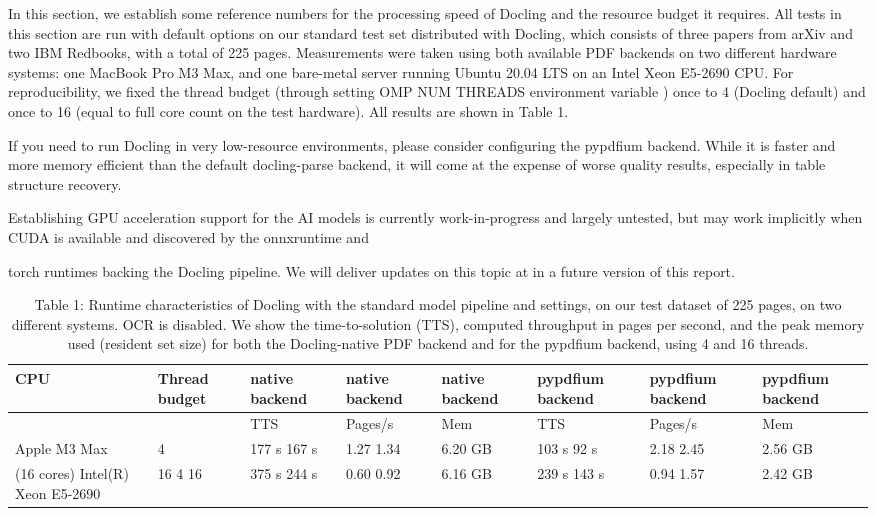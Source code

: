 \documentclass[11pt,a4paper]{article}
\begin{document}
In this section, we establish some reference numbers for the processing speed of Docling and the resource budget it requires. All tests in this section are run with default options on our standard test set distributed with Docling, which consists of three papers from arXiv and two IBM Redbooks, with a total of 225 pages. Measurements were taken using both available PDF backends on two different hardware systems: one MacBook Pro M3 Max, and one bare-metal server running Ubuntu 20.04 LTS on an Intel Xeon E5-2690 CPU. For reproducibility, we fixed the thread budget (through setting OMP NUM THREADS environment variable ) once to 4 (Docling default) and once to 16 (equal to full core count on the test hardware). All results are shown in Table 1.

If you need to run Docling in very low-resource environments, please consider configuring the pypdfium backend. While it is faster and more memory efficient than the default docling-parse backend, it will come at the expense of worse quality results, especially in table structure recovery.

Establishing GPU acceleration support for the AI models is currently work-in-progress and largely untested, but may work implicitly when CUDA is available and discovered by the onnxruntime and

torch runtimes backing the Docling pipeline. We will deliver updates on this topic at in a future version of this report.

\begin{table}[h]
\caption{Table 1: Runtime characteristics of Docling with the standard model pipeline and settings, on our test dataset of 225 pages, on two different systems. OCR is disabled. We show the time-to-solution (TTS), computed throughput in pages per second, and the peak memory used (resident set size) for both the Docling-native PDF backend and for the pypdfium backend, using 4 and 16 threads.}
\begin{tabular}{|l|l|l|l|l|l|l|l|}
\hline
CPU & Thread budget & native backend & native backend & native backend & pypdfium backend & pypdfium backend & pypdfium backend \\ \hline
 &  & TTS & Pages/s & Mem & TTS & Pages/s & Mem \\ \hline
Apple M3 Max & 4 & 177 s 167 s & 1.27 1.34 & 6.20 GB & 103 s 92 s & 2.18 2.45 & 2.56 GB \\ \hline
(16 cores) Intel(R) Xeon E5-2690 & 16 4 16 & 375 s 244 s & 0.60 0.92 & 6.16 GB & 239 s 143 s & 0.94 1.57 & 2.42 GB \\ \hline
\end{tabular}
\end{table}
\end{document}
